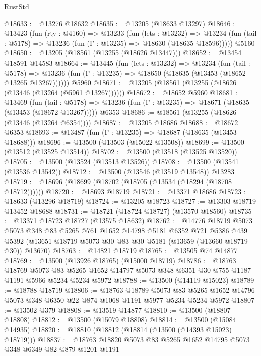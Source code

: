 \begin{lexlean}{RustStd}
\begin{coremodule}
@18633 := @13276 @18632
@18635 := @13205 (@18633 @13297)
@18646 := @13423
    (fun (rty : @4160) =>
    @13233
      (fun (lets : @13232) =>
      @13234 (fun (tail : @5178) => @13236 (fun (Γ : @13235) => @18630 (@18635 @18596)))))
    @5160
@18650 := @13205 (@18561 (@13255 (@18626 @13447)))
@18652 := @13454 @18591 @14583
@18664 := @13445
    (fun (lets : @13232) =>
    @13234
      (fun (tail : @5178) =>
      @13236 (fun (Γ : @13235) => @18650 (@18635 (@13453 (@18652 @13265 @13267))))))
    @5960
@18671 := @13205 (@18561 (@13255 (@18626 (@13446 (@13264 (@5961 @13267))))))
@18672 := @18652 @5960
@18681 := @13469
    (fun (tail : @5178) => @13236 (fun (Γ : @13235) => @18671 (@18635 (@13453 (@18672 @13267)))))
    @6353
@18686 := @18561 (@13255 (@18626 (@13446 (@13264 @6354))))
@18687 := @13205 @18686
@18688 := @18672 @6353
@18693 := @13487 (fun (Γ : @13235) => @18687 (@18635 (@13453 @18688)))
@18696 := @13500 (@13503 (@15022 @13508))
@18699 := @13500 (@13512 (@13525 @13514))
@18702 := @13500 (@13518 (@13525 @13520))
@18705 := @13500 (@13524 (@13513 @13526))
@18708 := @13500 (@13541 (@13536 @13542))
@18712 := @13500 (@13546 (@13519 @13548)) @13283
@18719 := @18696 (@18699 (@18702 (@18705 (@13534 (@18294 (@18708 @18712))))))
@18720 := @18693 @18719
@18721 := @13371 @18686
@18723 := @18633 (@13296 @18719)
@18724 := @13205 @18723
@18727 := @13303 @18719 @13452 @18688
@18731 := @18721 (@18724 @18727) (@13570 @18560)
@18735 := @13371 @18723 @18727 (@13575 @18632)
@18762 := @14776
    @18719
    @5073
    @5073
    @348
    @83
    @5265
    @761
    @1652
    @14798
    @5181
    @6352
    @721
    @5386
    @439
    @5392
    (@13651 @18719 @5073 @30 @83 @30 @5181 (@13659 (@13660 @18719 @30)) @13670)
@18763 := @14821 @18719
@18765 := @13505 @74 @14877
@18769 := @13500 (@13926 @18765) (@15000 @18719)
@18786 := @18763
    @18769
    @5073
    @83
    @5265
    @1652
    @14797
    @5073
    @348
    @6351
    @30
    @755
    @1187
    @1191
    @5966
    @5234
    @5234
    @5972
@18788 := @13500 (@14119 @15023)
@18789 := @18788 @18719
@18806 := @18763
    @18789
    @5073
    @83
    @5265
    @1652
    @14796
    @5073
    @348
    @6350
    @22
    @874
    @1068
    @1191
    @5977
    @5234
    @5234
    @5972
@18807 := @13502 @379
@18808 := @13519 @14877
@18810 := @13500 (@18807 @18808)
@18812 := @13500 (@15079 @18808)
@18814 := @13500 (@15084 @14935)
@18820 := @18810 (@18812 (@18814 (@13500 (@14393 @15023) @18719)))
@18837 := @18763
    @18820
    @5073
    @83
    @5265
    @1652
    @14795
    @5073
    @348
    @6349
    @82
    @879
    @1201
    @1191

\end{coremodule}
\end{lexlean}
